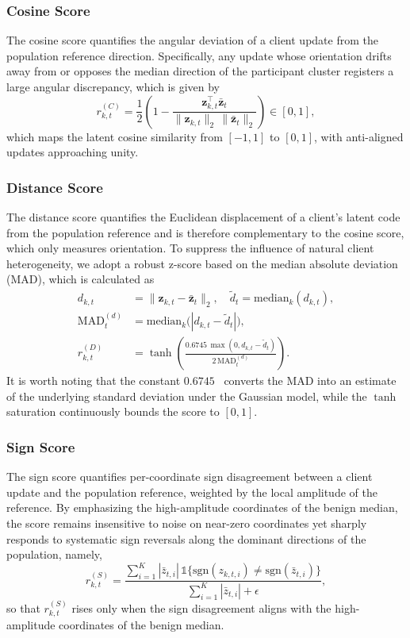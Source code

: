 \documentclass[journal]{IEEEtran}
\begin{document}
\subsubsection{Cosine Score}
The cosine score quantifies the angular deviation of a client update from the population reference direction. Specifically, any update whose orientation drifts away from or opposes the median direction of the participant cluster registers a large angular discrepancy, which is given by
\begin{equation}
r_{k,t}^{(C)} = \frac{1}{2}\!\left(1 - \frac{\mathbf{z}_{k,t}^{\!\top} \bar{\mathbf{z}}_t}{\|\mathbf{z}_{k,t}\|_2 \, \|\bar{\mathbf{z}}_t\|_2}\right) \in [0,1],
\label{eq:cos_score}
\end{equation}
which maps the latent cosine similarity from $[-1,1]$ to $[0,1]$, with anti-aligned updates approaching unity.

\subsubsection{Distance Score}
The distance score quantifies the Euclidean displacement of a client's latent code from the population reference and is therefore complementary to the cosine score, which only measures orientation. To suppress the influence of natural client heterogeneity, we adopt a robust z-score based on the median absolute deviation (MAD), which is calculated as
\begin{align}
d_{k,t} &= \|\mathbf{z}_{k,t} - \bar{\mathbf{z}}_t\|_2, \quad \tilde{d}_t = \mathrm{median}_k(d_{k,t}), \label{eq:dist_raw}\\
\mathrm{MAD}_t^{(d)} &= \mathrm{median}_k\bigl(|d_{k,t} - \tilde{d}_t|\bigr), \label{eq:dist_mad}\\
r_{k,t}^{(D)} &= \tanh\!\left(\frac{0.6745 \, \max(0, d_{k,t}-\tilde{d}_t)}{2\,\mathrm{MAD}_t^{(d)}}\right). \label{eq:dist_score}
\end{align}
It is worth noting that the constant $0.6745$~\cite{nist_modified_zscore} converts the MAD into an estimate of the underlying standard deviation under the Gaussian model, while the $\tanh$ saturation continuously bounds the score to $[0,1]$.

\subsubsection{Sign Score}
The sign score quantifies per-coordinate sign disagreement between a client update and the population reference, weighted by the local amplitude of the reference. By emphasizing the high-amplitude coordinates of the benign median, the score remains insensitive to noise on near-zero coordinates yet sharply responds to systematic sign reversals along the dominant directions of the population, namely,
\begin{equation}
r_{k,t}^{(S)} = \frac{\sum_{i=1}^{K} |\bar z_{t,i}|\,\mathbb{1}\{\mathrm{sgn}(z_{k,t,i}) \neq \mathrm{sgn}(\bar z_{t,i})\}}{\sum_{i=1}^{K} |\bar z_{t,i}| + \epsilon},
\label{eq:sign_score}
\end{equation}
so that $r_{k,t}^{(S)}$ rises only when the sign disagreement aligns with the high-amplitude coordinates of the benign median.
\end{document}
